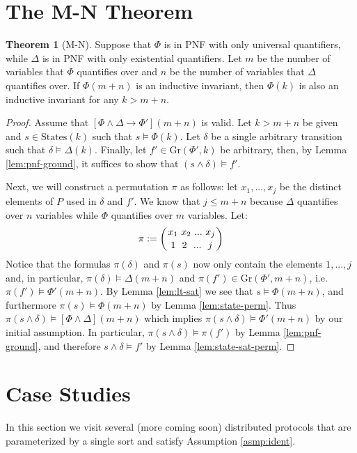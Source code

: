 \documentclass[12pt]{article}
\theoremstyle{definition}
\newtheorem{theorem}{Theorem}
\theoremstyle{remark}
\newcommand{\msp}{\text{ }}
\newcommand{\states}{\text{States}}
\newcommand{\gr}{\text{Gr}}
\newcommand{\perm}{\genfrac{}{}{0pt}{}}
\begin{document}
\section{The M-N Theorem}
\begin{theorem}[M-N]
  Suppose that $\Phi$ is in PNF with only universal quantifiers, while $\Delta$ is in PNF with only existential quantifiers.  Let $m$ be the number of variables that $\Phi$ quantifies over and $n$ be the number of variables that $\Delta$ quantifies over.  If $\Phi(m+n)$ is an inductive invariant, then $\Phi(k)$ is also an inductive invariant for any $k>m+n$.
\end{theorem}
\begin{proof}
  Assume that $[\Phi\land\Delta \rightarrow \Phi'](m+n)$ is valid.  Let $k>m+n$ be given and $s \in \states(k)$ such that $s \models \Phi(k)$.  Let $\delta$ be a single arbitrary transition such that $\delta \models \Delta(k)$.  Finally, let $f' \in \gr(\Phi',k)$ be arbitrary, then, by Lemma \ref{lem:pnf-ground}, it suffices to show that $(s \land \delta) \models f'$.

  Next, we will construct a permutation $\pi$ as follows: let $x_1,...,x_j$ be the distinct elements of $P$ used in $\delta$ and $f'$.  We know that $j \leq m+n$ because $\Delta$ quantifies over $n$ variables while $\Phi$ quantifies over $m$ variables.  Let:
  $$\pi := \left( \perm{x_1 \msp x_2 \msp ... \msp x_j}{1 \msp\msp 2 \msp\msp ... \msp\msp j} \right)$$
  Notice that the formulas $\pi(\delta)$ and $\pi(s)$ now only contain the elements $1,...,j$ and, in particular, $\pi(\delta) \models \Delta(m+n)$ and $\pi(f') \in \gr(\Phi',m+n)$, i.e. $\pi(f') \models \Phi'(m+n)$.  By Lemma \ref{lem:lt-sat} we see that $s \models \Phi(m+n)$, and furthermore $\pi(s) \models \Phi(m+n)$ by Lemma \ref{lem:state-perm}.  Thus $\pi(s \land \delta) \models [\Phi\land\Delta](m+n)$ which implies $\pi(s \land \delta) \models \Phi'(m+n)$ by our initial assumption.  In particular, $\pi(s \land \delta) \models \pi(f')$ by Lemma \ref{lem:pnf-ground}, and therefore $s \land \delta \models f'$ by Lemma \ref{lem:state-sat-perm}.
\end{proof}



\section{Case Studies}
In this section we visit several (more coming soon) distributed protocols that are parameterized by a single sort and satisfy Assumption \ref{asmp:ident}.
\end{document}
